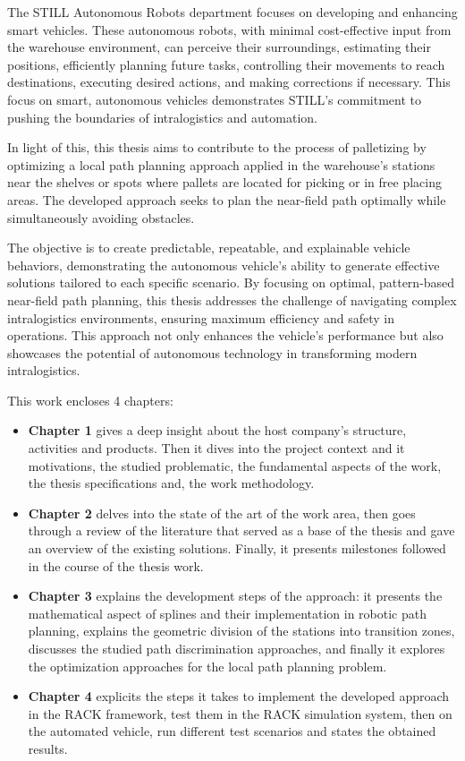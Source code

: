 \newpage
\thispagestyle{intro} 

The STILL Autonomous Robots department focuses on developing and enhancing smart vehicles. These autonomous robots, 
with minimal cost-effective input from the warehouse environment, can perceive their surroundings, estimating their 
positions, efficiently planning future tasks, controlling their movements to reach destinations, executing desired 
actions, and making corrections if necessary. This focus on smart, autonomous vehicles demonstrates STILL's commitment 
to pushing the boundaries of intralogistics and automation. 

In light of this, this thesis aims to contribute to the process of palletizing by optimizing a local path planning 
approach applied in the warehouse's stations near the shelves or spots where pallets are located for picking or in 
free placing areas. The developed approach seeks to plan the near-field path optimally while simultaneously avoiding 
obstacles. 

The objective is to create predictable, repeatable, and explainable vehicle behaviors, demonstrating the autonomous 
vehicle's ability to generate effective solutions tailored to each specific scenario. By focusing on optimal, 
pattern-based near-field path planning, this thesis addresses the challenge of navigating complex intralogistics 
environments, ensuring maximum efficiency and safety in operations. This approach not only enhances the vehicle's 
performance but also showcases the potential of autonomous technology in transforming modern intralogistics. 


This work encloses 4 chapters: 
\begin{itemize}
    \item \textbf{Chapter 1} gives a deep insight about the host company’s structure, activities and products. 
    Then it dives into the project context and it motivations, the studied problematic, the fundamental aspects of 
    the work, the thesis specifications and, the work methodology. 
    \item \textbf{Chapter 2} delves into the state of the art of the work area, then goes through a review of the 
    literature that served as a base of the thesis and gave an overview of the existing solutions. Finally, 
    it presents milestones followed in the course of the thesis work. 
    \item \textbf{Chapter 3} explains the development steps of the approach: it presents the mathematical aspect of 
    splines and their implementation in robotic path planning, explains the geometric division of the stations 
    into transition zones, discusses the studied path discrimination approaches, and finally it explores the optimization 
    approaches for the local path planning problem. 
    \item \textbf{Chapter 4} explicits the steps it takes to implement the developed approach in the RACK framework, 
    test them in the RACK simulation system, then on the automated vehicle, run different test scenarios and states 
    the obtained results. 
\end{itemize}

\newpage
\thispagestyle{intro}